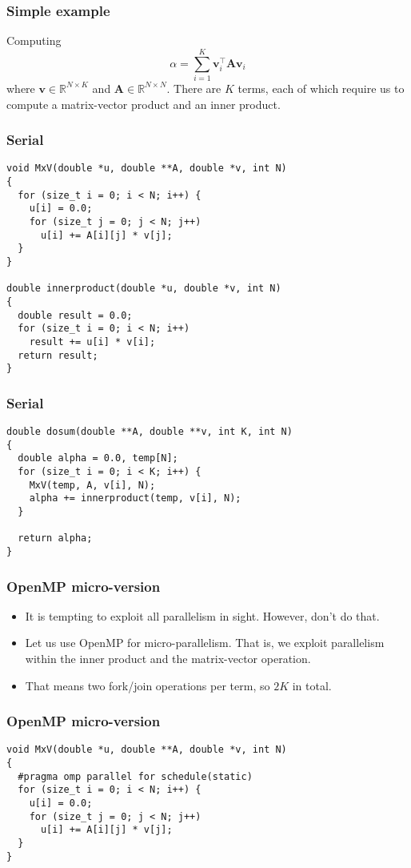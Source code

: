 \begin{frame}
  \frametitle{Simple example}
  Computing
  \[
    \alpha = \sum_{i=1}^K \bm v_i^\intercal \bm A \bm v_i
  \]
  where $\bm v \in \mathbb{R}^{N \times K}$ and
  $\bm A \in \mathbb{R}^{N \times N}$. There are $K$ terms, each of which
  require us to compute a matrix-vector product and an inner product.
\end{frame}

\begin{frame}[fragile]
  \frametitle{Serial}
\begin{lstlisting}[style=c, basicstyle=\ttfamily\footnotesize]
void MxV(double *u, double **A, double *v, int N)
{
  for (size_t i = 0; i < N; i++) {
    u[i] = 0.0;
    for (size_t j = 0; j < N; j++)
      u[i] += A[i][j] * v[j];
  }
}

double innerproduct(double *u, double *v, int N)
{
  double result = 0.0;
  for (size_t i = 0; i < N; i++)
    result += u[i] * v[i];
  return result;
}
\end{lstlisting}
\end{frame}

\begin{frame}[fragile]
  \frametitle{Serial}
\begin{lstlisting}[style=c]
double dosum(double **A, double **v, int K, int N)
{
  double alpha = 0.0, temp[N];
  for (size_t i = 0; i < K; i++) {
    MxV(temp, A, v[i], N);
    alpha += innerproduct(temp, v[i], N);
  }

  return alpha;
}
\end{lstlisting}
\end{frame}

\begin{frame}
  \frametitle{OpenMP micro-version}
  \begin{itemize}
  \item It is tempting to exploit all parallelism in sight. However, don't do
    that.
  \item Let us use OpenMP for micro-parallelism. That is, we exploit parallelism
    within the inner product and the matrix-vector operation.
  \item That means two fork/join operations per term, so $2K$ in total.
  \end{itemize}
\end{frame}

\begin{frame}[fragile]
  \frametitle{OpenMP micro-version}
\begin{lstlisting}[style=c]
void MxV(double *u, double **A, double *v, int N)
{
  #pragma omp parallel for schedule(static)
  for (size_t i = 0; i < N; i++) {
    u[i] = 0.0;
    for (size_t j = 0; j < N; j++)
      u[i] += A[i][j] * v[j];
  }
}
\end{lstlisting}
\end{frame}

